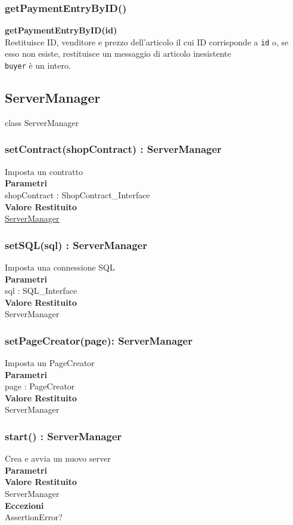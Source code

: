 \documentclass[a4paper, 12pt]{article}
\begin{document}
\subsubsection{getPaymentEntryByID()}
\textbf{getPaymentEntryByID(id)} \\
Restituisce ID, venditore e prezzo dell'articolo il cui ID corrisponde a \texttt{id} o, se esso non esiste, restituisce un messaggio di articolo inesistente \\
\texttt{buyer} è un intero.

\subsection{ServerManager}
class ServerManager
\subsubsection{setContract(shopContract) : ServerManager}
Imposta un contratto\\
\textbf{Parametri}\\
shopContract : ShopContract\_Interface\\
\textbf{Valore Restituito}\\
\underline{\href{\linkServerManager}{ServerManager}}\\
\subsubsection{setSQL(sql) : ServerManager}
Imposta una connessione SQL\\
\textbf{Parametri}\\
sql : SQL\_Interface\\
\textbf{Valore Restituito}\\
ServerManager
\subsubsection{setPageCreator(page): ServerManager}
Imposta un PageCreator\\
\textbf{Parametri}\\
page : PageCreator\\
\textbf{Valore Restituito}\\
ServerManager
\subsubsection{start() : ServerManager}
Crea e avvia un nuovo server\\
\textbf{Parametri}\\
\textbf{Valore Restituito}\\
ServerManager\\
\textbf{Eccezioni}\\
AssertionError?
\end{document}
